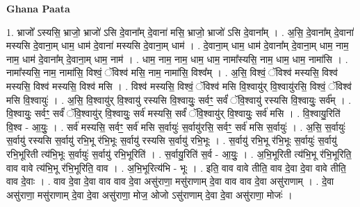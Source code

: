 \documentclass[17pt]{extarticle}
\begin{document}
\textbf{Ghana Paata } \newline

1. भ्राजो᳚ ऽस्यसि॒ भ्राजो॒ भ्राजो॑ ऽसि दे॒वाना᳚म् दे॒वाना॑ मसि॒ भ्राजो॒ भ्राजो॑ ऽसि दे॒वाना᳚म् । . अ॒सि॒ दे॒वाना᳚म् दे॒वाना॑ मस्यसि दे॒वाना॒म् धाम॒ धाम॑ दे॒वाना॑ मस्यसि दे॒वाना॒म् धाम॑ । . दे॒वाना॒म् धाम॒ धाम॑ दे॒वाना᳚म् दे॒वाना॒म् धाम॒ नाम॒ नाम॒ धाम॑ दे॒वाना᳚म् दे॒वाना॒म् धाम॒ नाम॑ । . धाम॒ नाम॒ नाम॒ धाम॒ धाम॒ नामा᳚स्यसि॒ नाम॒ धाम॒ धाम॒ नामा॑सि । . नामा᳚स्यसि॒ नाम॒ नामा॑सि॒ विश्वं॒ ॅविश्व॑ मसि॒ नाम॒ नामा॑सि॒ विश्व᳚म् । . अ॒सि॒ विश्वं॒ ॅविश्व॑ मस्यसि॒ विश्व॑ मस्यसि॒ विश्व॑ मस्यसि॒ विश्व॑ मसि । . विश्व॑ मस्यसि॒ विश्वं॒ ॅविश्व॑ मसि वि॒श्वायु॑र् वि॒श्वायु॑रसि॒ विश्वं॒ ॅविश्व॑ मसि वि॒श्वायुः॑ । . अ॒सि॒ वि॒श्वायु॑र् वि॒श्वायु॑ रस्यसि वि॒श्वायुः॒ सर्वꣳ॒॒ सर्वं॑ ॅवि॒श्वायु॑ रस्यसि वि॒श्वायुः॒ सर्व᳚म् । . वि॒श्वायुः॒ सर्वꣳ॒॒ सर्वं॑ ॅवि॒श्वायु॑र् वि॒श्वायुः॒ सर्व॑ मस्यसि॒ सर्वं॑ ॅवि॒श्वायु॑र् वि॒श्वायुः॒ सर्व॑ मसि । . वि॒श्वायु॒रिति॑ वि॒श्व - आ॒युः॒ । . सर्व॑ मस्यसि॒ सर्वꣳ॒॒ सर्व॑ मसि स॒र्वायुः॑ स॒र्वायु॑रसि॒ सर्वꣳ॒॒ सर्व॑ मसि स॒र्वायुः॑ । . अ॒सि॒ स॒र्वायुः॑ स॒र्वायु॑ रस्यसि स॒र्वायु॑ रभि॒भू र॑भि॒भूः स॒र्वायु॑ रस्यसि स॒र्वायु॑ रभि॒भूः । . स॒र्वायु॑ रभि॒भू र॑भि॒भूः स॒र्वायुः॑ स॒र्वायु॑ रभि॒भूरिती त्य॑भि॒भूः स॒र्वायुः॑ स॒र्वायु॑ रभि॒भूरिति॑ । . स॒र्वायु॒रिति॑ स॒र्व - आ॒युः॒ । . अ॒भि॒भूरिती त्य॑भि॒भू र॑भि॒भूरिति॒ वाव वावे त्य॑भि॒भू र॑भि॒भूरिति॒ वाव । . अ॒भि॒भूरित्य॑भि - भूः । . इति॒ वाव वावे तीति॒ वाव दे॒वा दे॒वा वावे तीति॒ वाव दे॒वाः । . वाव दे॒वा दे॒वा वाव वाव दे॒वा असु॑राणा॒ मसु॑राणाम् दे॒वा वाव वाव दे॒वा असु॑राणाम् । . दे॒वा असु॑राणा॒ मसु॑राणाम् दे॒वा दे॒वा असु॑राणा॒ मोज॒ ओजो ऽसु॑राणाम् दे॒वा दे॒वा असु॑राणा॒ मोजः॑ । \newline
\end{document}
